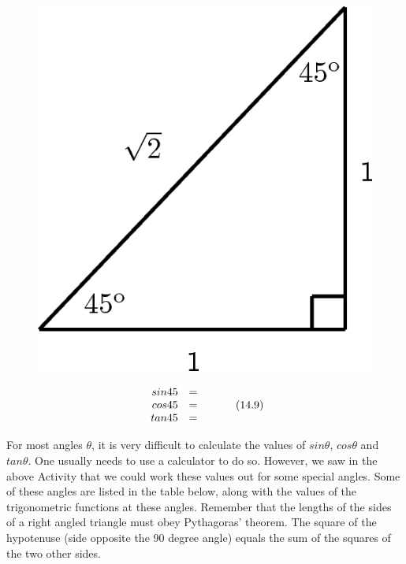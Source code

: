 \begin{enumerate}[noitemsep, label=\textbf{\arabic*}. ]
\begin{figure}[H]
\begin{center}
    \label{m39408*id80587!!!underscore!!!media}\label{m39408*id80587!!!underscore!!!printimage}\includegraphics{col11306.imgs/m39408_MG10C15_007.png} %
      \vspace{2pt}
    \vspace{.1in}
    \end{center}
 \end{figure}       \label{m39408*id80598}\nopagebreak\noindent{}
    \begin{equation}
    \begin{array}{ccc}\hfill sin45& =& \\ \hfill cos45& =& \\ \hfill tan45& =\end{array}\tag{14.9}
      \end{equation}
    \end{enumerate}
      \label{m39408*id80673}For most angles $\theta $, it is very difficult to calculate the values of $sin\theta $, $cos\theta $ and $tan\theta $. One usually needs to use a calculator to do so. However, we saw in the above Activity that we could work these values out for some special angles. Some of these angles are listed in the table below, along with the values of the trigonometric functions at these angles. Remember that the lengths of the sides of a right angled triangle must obey Pythagoras' theorem. The square of the hypotenuse (side opposite the 90 degree angle) equals the sum of the squares of the two other sides.\par 
